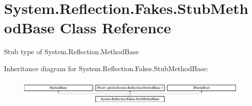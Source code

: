 \hypertarget{class_system_1_1_reflection_1_1_fakes_1_1_stub_method_base}{\section{System.\-Reflection.\-Fakes.\-Stub\-Method\-Base Class Reference}
\label{class_system_1_1_reflection_1_1_fakes_1_1_stub_method_base}
}


Stub type of System.\-Reflection.\-Method\-Base 


Inheritance diagram for System.\-Reflection.\-Fakes.\-Stub\-Method\-Base\-:\begin{figure}[H]
\begin{center}
\leavevmode
\includegraphics[height=1.314554cm]{class_system_1_1_reflection_1_1_fakes_1_1_stub_method_base}
\end{center}
\end{figure}
